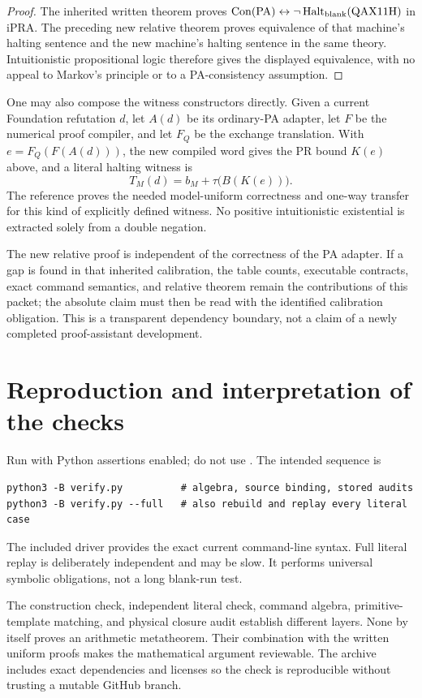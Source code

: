 \documentclass[11pt,a4paper]{article}
\newcommand{\ipra}{\mathrm{iPRA}}
\newcommand{\PA}{\mathrm{PA}}
\newcommand{\Con}{\operatorname{Con}}
\newcommand{\Halt}{\operatorname{Halt}}
\newcommand{\file}[1]{\texttt{\path{#1}}}
\begin{document}
\begin{proof}
The inherited written theorem proves
$\Con(\PA)\leftrightarrow\neg\Halt_{\rm blank}(\mathrm{QAX11H})$
in $\ipra$. The preceding new relative theorem proves equivalence
of that machine's halting sentence and the new machine's halting
sentence in the same theory. Intuitionistic propositional logic
therefore gives the displayed equivalence, with no appeal to
Markov's principle or to a PA-consistency assumption.
\end{proof}

One may also compose the witness constructors directly. Given a
current Foundation refutation $d$, let $A(d)$ be its ordinary-PA
adapter, let $F$ be the numerical proof compiler, and let $F_Q$ be
the exchange translation. With $e=F_Q(F(A(d)))$, the new compiled
word gives the PR bound $K(e)$ above, and a literal halting witness is
\[
 T_M(d)=b_M+\tau\bigl(B(K(e))\bigr).
\]
The reference proves the needed model-uniform correctness and
one-way transfer for this kind of explicitly defined witness.
No positive intuitionistic existential is extracted solely from a
double negation.

The new relative proof is independent of the correctness of the
PA adapter. If a gap is found in that inherited calibration, the
table counts, executable contracts, exact command semantics, and
relative theorem remain the contributions of this packet; the
absolute claim must then be read with the identified calibration
obligation. This is a transparent dependency boundary, not a claim
of a newly completed proof-assistant development.

\section{Reproduction and interpretation of the checks}

Run with Python assertions enabled; do not use \file{python -O}.
The intended sequence is
\begin{verbatim}
python3 -B verify.py          # algebra, source binding, stored audits
python3 -B verify.py --full   # also rebuild and replay every literal case
\end{verbatim}
The included driver provides the exact current command-line syntax.
Full literal replay is deliberately independent and may be slow.
It performs universal symbolic obligations, not a long blank-run
test.

The construction check, independent literal check, command algebra,
primitive-template matching, and physical closure audit establish
different layers. None by itself proves an arithmetic metatheorem.
Their combination with the written uniform proofs makes the
mathematical argument reviewable. The archive includes exact
dependencies and licenses so the check is reproducible without
trusting a mutable GitHub branch.
\end{document}
